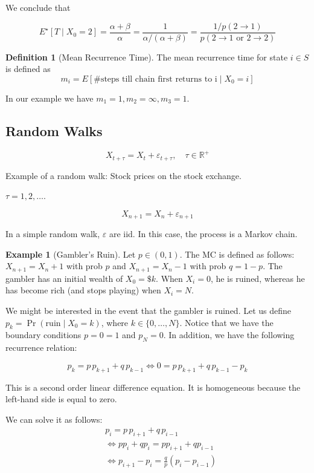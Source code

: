 \documentclass{article}
\theoremstyle{definition}
\newtheorem{exmp}{Example}[section]
\newtheorem{defn}{Definition}[section]
\begin{document}
We conclude that 

$$
E^\star \left[ T \mid X_0 =2 \right] = \frac{\alpha+\beta}{\alpha} = \frac{1}{\alpha/(\alpha+\beta)} = \frac{1/p(2\to1)}{p(2\to1 \text{ or } 2 \to 2)}
$$

\begin{defn}[Mean Recurrence Time] The mean recurrence time for state $i \in S$ is defined as 
$$
m_i = E \left[ \text{\# steps till chain first returns to i} \mid X_0 = i \right]
$$
\end{defn}

In our example we have $m_1 = 1, m_2 = \infty, m_3 = 1$.

\subsection{Random Walks}

$$
X_{t + \tau} = X_t + \varepsilon_{t + \tau}, \quad \tau \in \mathbb{R}^+
$$

Example of a random walk: Stock prices on the stock exchange. 

$\tau = 1,2,\ldots$.

$$
X_{n+1} = X_n + \varepsilon_{n+1}
$$

In a simple random walk, $\varepsilon$ are iid. In this case, the process is a Markov chain. 

\begin{exmp}[Gambler's Ruin]
Let $p \in (0,1)$. The MC is defined as follows:
$X_{n+1} = X_n + 1$ with prob $p$ and $X_{n+1} = X_n -1$ with prob $q=1-p$. The gambler has an initial wealth of $X_0 = \$k$. When $X_i = 0$, he is ruined, whereas he has become rich (and stops playing) when $X_i = N$. 
\end{exmp}

We might be interested in the event that the gambler is ruined. Let us define $p_k = \Pr \left( \text{ruin} \mid X_0 = k \right)$, where $k \in \{0, \ldots, N\}$. 
Notice that we have the boundary conditions $p=0 = 1$ and $p_N = 0$. In addition, we have the following recurrence relation:

$$
p_k = p \, p_{k+1} + q \, p_{k-1} \iff 0 = p \, p_{k+1} + q \, p_{k-1} - p_k
$$

This is a second order linear difference equation. It is homogeneous because the left-hand side is equal to zero. 

We can solve it as follows: 
\begin{align*}
&p_i = p \, p_{i+1} + q \, p_{i-1} \\
&\iff p p_i + q p_i = p p_{i+1} + q p_{i-1} \\
&\iff p_{i+1} - p_i = \tfrac{q}{p} \left( p_i - p_{i-1} \right) 
\end{align*}
\end{document}

